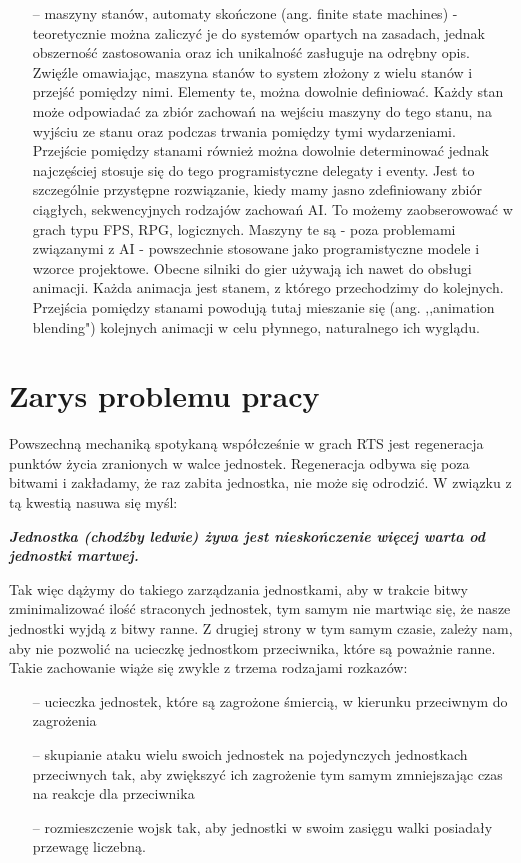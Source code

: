 \documentclass[12pt]{report}
\begin{document}
\begin{itemize}
\item[--] maszyny stanów, automaty skończone (ang. finite state machines) - teoretycznie można zaliczyć je do systemów opartych na zasadach, jednak obszerność zastosowania oraz ich unikalność zasługuje na odrębny opis. Zwięźle omawiając, maszyna stanów to system złożony z wielu stanów i przejść pomiędzy nimi. Elementy te, można dowolnie definiować. Każdy stan może odpowiadać za zbiór zachowań na wejściu maszyny do tego stanu, na wyjściu ze stanu oraz podczas trwania pomiędzy tymi wydarzeniami. Przejście pomiędzy stanami również można dowolnie determinować jednak najczęściej stosuje się do tego programistyczne delegaty i eventy. Jest to szczególnie przystępne rozwiązanie, kiedy mamy jasno zdefiniowany zbiór ciągłych, sekwencyjnych rodzajów zachowań AI. To możemy zaobserowować w grach typu FPS, RPG, logicznych. Maszyny te są - poza problemami związanymi z AI - powszechnie stosowane jako programistyczne modele i wzorce projektowe. Obecne silniki do gier używają ich nawet do obsługi animacji. Każda animacja jest stanem, z którego przechodzimy do kolejnych.  Przejścia pomiędzy stanami powodują tutaj mieszanie się (ang. ,,animation blending") kolejnych animacji w celu płynnego, naturalnego ich wyglądu.
\end{itemize}







\section {Zarys problemu pracy}
Powszechną mechaniką spotykaną współcześnie w grach RTS jest regeneracja punktów życia zranionych w walce jednostek. Regeneracja odbywa się poza bitwami i zakładamy, że raz zabita jednostka, nie może się odrodzić. W związku z tą kwestią nasuwa się myśl:

\textbf{\textit{Jednostka (chodźby ledwie) żywa jest nieskończenie więcej warta od jednostki martwej.}}

Tak więc dążymy do takiego zarządzania jednostkami, aby w trakcie bitwy zminimalizować ilość straconych jednostek, tym samym nie martwiąc się, że nasze jednostki wyjdą z bitwy ranne. Z drugiej strony w tym samym czasie, zależy nam, aby nie pozwolić na ucieczkę jednostkom przeciwnika, które są poważnie ranne. Takie zachowanie wiąże się zwykle z trzema rodzajami rozkazów:
\begin{itemize}
\item[--] ucieczka jednostek, które są zagrożone śmiercią, w kierunku przeciwnym do zagrożenia
\item[--] skupianie ataku wielu swoich jednostek na pojedynczych jednostkach przeciwnych tak, aby zwiększyć ich zagrożenie tym samym zmniejszając czas na reakcje dla przeciwnika
\item[--] rozmieszczenie wojsk tak, aby jednostki w swoim zasięgu walki posiadały przewagę liczebną.
\end{itemize}
\end{document}
